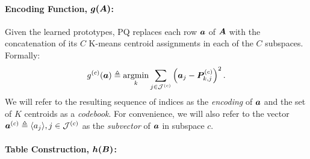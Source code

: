
\vspace{-2.5mm}
\paragraph{Encoding Function, $\bm{g(\bm{A})}$:}

Given the learned prototypes, PQ replaces each row $\bm{a}$ of $\bm{A}$ with the concatenation of its $C$ K-means centroid assignments in each of the $C$ subspaces. Formally:
\vspace{-.5mm}
\begin{align} \label{eq:pqLoss}
    g^{(c)}(\a) \triangleq \argmin_k \sum_{j\in \mathcal{J}^{(c)}} \left( \a_j - \mat{P}^{(c)}_{k,j} \right)^2.
\vspace*{-.5mm}
\end{align}
We will refer to the resulting sequence of indices as the \textit{encoding} of $\bm{a}$ and the set of $K$ centroids as a \textit{codebook}. For convenience, we will also refer to the vector $\bm{a}^{(c)} \triangleq \langle a_j \rangle, j \in \mathcal{J}^{(c)}$ as the \textit{subvector} of $\bm{a}$ in subspace $c$. %

\vspace{-2.5mm}
\paragraph{Table Construction, $\bm{h(\bm{B})}$:}


